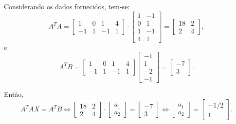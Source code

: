 \documentclass[12pt,a4paper]{article}
\begin{document}
\begin{ExerciseList}
Considerando os dados fornecidos, tem-se:
\[
A^T A
=
\begin{bmatrix}
 1 & 0 &  1 & 4 \\
-1 & 1 & -1 & 1
\end{bmatrix}
\cdot
\begin{bmatrix}
1 & -1 \\
0 &  1 \\
1 & -1 \\
4 &  1
\end{bmatrix}
=
\begin{bmatrix}
18 & 2 \\
2 & 4
\end{bmatrix},
\]
e
\[
A^T B
=
\begin{bmatrix}
1 & 0 &  1 & 4 \\
-1 & 1 & -1 & 1
\end{bmatrix}
\begin{bmatrix}
-1 \\
1 \\
-2 \\
-1
\end{bmatrix}
=
\begin{bmatrix}
-7 \\ 3
\end{bmatrix}.
\]

Então,
\[
A^T A X = A^T B
\Leftrightarrow
\begin{bmatrix}
18 & 2 \\
2 & 4
\end{bmatrix}
\cdot
\begin{bmatrix}
a_1\\
a_2
\end{bmatrix}
=
\begin{bmatrix}
-7 \\ 3
\end{bmatrix}
\Leftrightarrow
\begin{bmatrix}
a_1\\
a_2
\end{bmatrix}
=
\begin{bmatrix}
-1/2\\
1
\end{bmatrix}.
\]


\end{ExerciseList}
\end{document}
